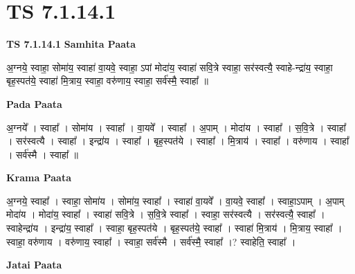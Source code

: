 \documentclass[17pt]{extarticle}
\begin{document}
\section{ TS 7.1.14.1 }

\textbf{TS 7.1.14.1 } \newline
\textbf{Samhita Paata} \newline

अ॒ग्नये॒ स्वाहा॒ सोमा॑य॒ स्वाहा॑ वा॒यवे॒ स्वाहा॒ ऽपां मोदा॑य॒ स्वाहा॑ सवि॒त्रे स्वाहा॒ सर॑स्वत्यै॒ स्वाहे-न्द्रा॑य॒ स्वाहा॒ बृह॒स्पत॑ये॒ स्वाहा॑ मि॒त्राय॒ स्वाहा॒ वरु॑णाय॒ स्वाहा॒ सर्व॑स्मै॒ स्वाहा᳚ ॥ \newline

\textbf{Pada Paata} \newline

अ॒ग्नये᳚ । स्वाहा᳚ । सोमा॑य । स्वाहा᳚ । वा॒यवे᳚ । स्वाहा᳚ । अ॒पाम् । मोदा॑य । स्वाहा᳚ । स॒वि॒त्रे । स्वाहा᳚ । सर॑स्वत्यै । स्वाहा᳚ । इन्द्रा॑य । स्वाहा᳚ । बृह॒स्पत॑ये । स्वाहा᳚ । मि॒त्राय॑ । स्वाहा᳚ । वरु॑णाय । स्वाहा᳚ । सर्व॑स्मै । स्वाहा᳚ ॥  \newline


\textbf{Krama Paata} \newline

अ॒ग्नये॒ स्वाहा᳚ । स्वाहा॒ सोमा॑य । सोमा॑य॒ स्वाहा᳚ । स्वाहा॑ वा॒यवे᳚ । वा॒यवे॒ स्वाहा᳚ । स्वाहा॒ऽपाम् । अ॒पाम् मोदा॑य । मोदा॑य॒ स्वाहा᳚ । स्वाहा॑ सवि॒त्रे । स॒वि॒त्रे स्वाहा᳚ । स्वाहा॒ सर॑स्वत्यै । सर॑स्वत्यै॒ स्वाहा᳚ । स्वाहेन्द्रा॑य । इन्द्रा॑य॒ स्वाहा᳚ । स्वाहा॒ बृह॒स्पत॑ये । बृह॒स्पत॑ये॒ स्वाहा᳚ । स्वाहा॑ मि॒त्राय॑ । मि॒त्राय॒ स्वाहा᳚ । स्वाहा॒ वरु॑णाय । वरु॑णाय॒ स्वाहा᳚ । स्वाहा॒ सर्व॑स्मै । सर्व॑स्मै॒ स्वाहा᳚ ।? स्वाहेति॒ स्वाहा᳚ । \newline

\textbf{Jatai Paata} \newline
\end{document}
